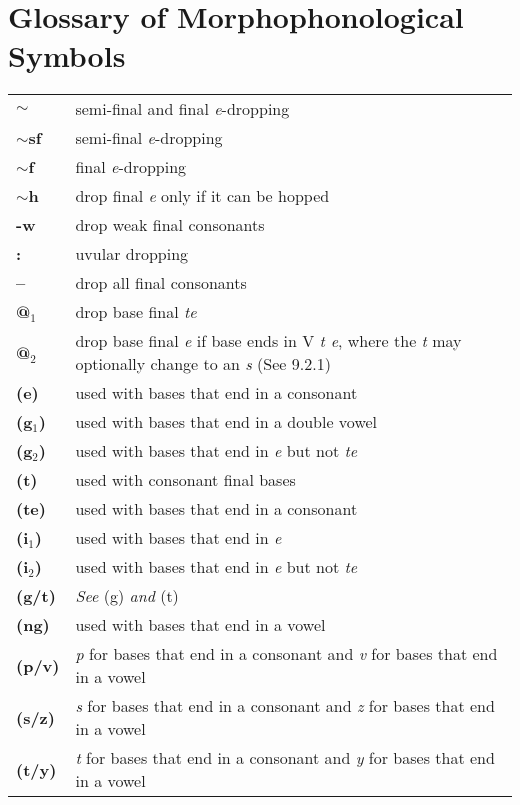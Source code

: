 \documentclass{article}
\begin{document}
\section{Glossary of Morphophonological Symbols}

\begin{tabular}{l l}

\textbf{$\sim$} & semi-final and final \textit{e}-dropping \\
\textbf{$\sim$sf} & semi-final \textit{e}-dropping \\
\textbf{$\sim$f} & final \textit{e}-dropping \\
\textbf{$\sim$h} & drop final \textit{e} only if it can be hopped \\
\textbf{-w} & drop weak final consonants \\
\textbf{:} & uvular dropping \\
\textbf{--} & drop all final consonants \\
\textbf{@$_\text{1}$} & drop base final \textit{te} \\
\textbf{@$_\text{2}$} & drop base final \textit{e} if base ends in V \textit{t e}, where the \textit{t} may optionally change to an \textit{s} (See 9.2.1) \\
\textbf{(e)} & used with bases that end in a consonant \\
\textbf{(g$_\text{1}$)} & used with bases that end in a double vowel \\
\textbf{(g$_\text{2}$)} & used with bases that end in \textit{e} but not \textit{te} \\
\textbf{(t)} & used with consonant final bases \\
\textbf{(te)} & used with bases that end in a consonant \\
\textbf{(i$_\text{1}$)} & used with bases that end in \textit{e} \\
\textbf{(i$_\text{2}$)} & used with bases that end in \textit{e} but not \textit{te} \\
\textbf{(g/t)} & \textit{See} (g) \textit{and} (t) \\
\textbf{(ng)} & used with bases that end in a vowel \\
\textbf{(p/v)} & \textit{p} for bases that end in a consonant and \textit{v} for bases that end in a vowel \\
\textbf{(s/z)} & \textit{s} for bases that end in a consonant and \textit{z} for bases that end in a vowel \\
\textbf{(t/y)} & \textit{t} for bases that end in a consonant and \textit{y} for bases that end in a vowel \\

\end{tabular}
\end{document}
